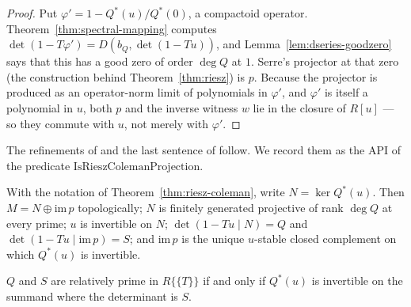 \begin{proof}
  \leanok
  Put $\varphi' = 1 - Q^{*}(u)/Q^{*}(0)$, a compactoid operator.  Theorem~\ref{thm:spectral-mapping}
  computes $\det(1 - T\varphi') = D(b_Q, \det(1-Tu))$, and Lemma~\ref{lem:dseries-goodzero}
  says that this has a good zero of order $\deg Q$ at $1$.  Serre's projector at that zero
  (the construction behind Theorem~\ref{thm:riesz}) is $p$.  Because the projector is produced
  as an operator-norm limit of polynomials in $\varphi'$, and $\varphi'$ is itself a polynomial
  in $u$, both $p$ and the inverse witness $w$ lie in the closure of $R[u]$ --- so they commute
  with $u$, not merely with $\varphi'$.
\end{proof}

The refinements of \cite[Proposition 3.2 and Theorem 3.3]{Buzzard} and the last sentence of
\cite[Theorem 2.2.2]{JN} follow.  We record them as the API of the predicate
$\mathrm{IsRieszColemanProjection}$.

\begin{theorem}
  \label{thm:riesz-coleman-full}
  \leanok
  With the notation of Theorem~\ref{thm:riesz-coleman}, write $N = \ker Q^{*}(u)$.  Then
  $M = N \oplus \mathrm{im}\,p$ topologically; $N$ is finitely generated projective of rank
  $\deg Q$ at every prime; $u$ is invertible on $N$; $\det(1-Tu \mid N) = Q$ and
  $\det(1-Tu\mid \mathrm{im}\,p) = S$; and $\mathrm{im}\,p$ is the unique $u$-stable closed
  complement on which $Q^{*}(u)$ is invertible.
\end{theorem}

\begin{lemma}
  \label{lem:coprime-iff-unit}
  \leanok
  $Q$ and $S$ are relatively prime in $R\{\{T\}\}$ if and only if $Q^{*}(u)$ is invertible on
  the summand where the determinant is $S$.
\end{lemma}

